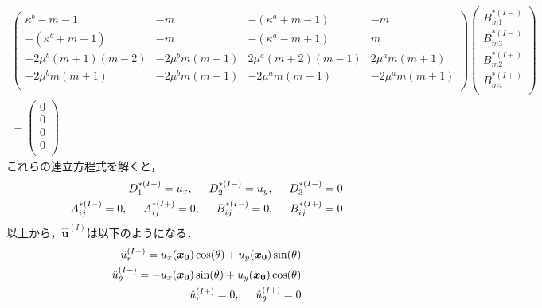 \begin{align}
	\left(
	\begin{array}{cccc}
		\kappa^b-m-1& -m & -(\kappa^a+m-1) & -m \\
		-(\kappa^b+m+1) & -m & -(\kappa^a-m+1) & m \\
		-2\mu^{b}(m+1)(m-2) & -2\mu^{b}m(m-1) &
		2\mu^{a}(m+2)(m-1) & 2\mu^{a}m(m+1) \\
		-2\mu^{b}m(m+1) & -2\mu^{b}m(m-1) &
		-2\mu^{a}m(m-1) & -2\mu^{a}m(m+1) \\
	\end{array}
	\right)
	\left(
	\begin{array}{c}
		B_{m1}^{*(I-)} \\
	 	B_{m3}^{*(I-)} \\
		B_{m2}^{*(I+)}\\
	 	B_{m4}^{*(I+)} \\
	\end{array}
	\right)
	\nonumber
	\\
	=
	\left(
	\begin{array}{c}
		0 \\
	 	0 \\
		0 \\
	 	0 \\
	\end{array}
	\right)
\end{align}
これらの連立方程式を解くと，
\begin{align}
	D_{1}^{*(I-)}=u_{x},\hspace{0.5cm}D_{2}^{*(I-)}=u_{y},\hspace{0.5cm}D_{3}^{*(I-)}=0
	\nonumber
	\\
	A_{ij}^{*(I-)}=0,\hspace{0.5cm}A_{ij}^{*(I+)}=0,\hspace{0.5cm}
	B_{ij}^{*(I-)}=0,\hspace{0.5cm}B_{ij}^{*(I+)}=0
\end{align}
以上から，$\hat{\bm{u}}^{(I)}$は以下のようになる．
\begin{align}
	\hat{u}_{r}^{(I-)}=u_{x}(\bm{x_{0}})\cos(\theta)+u_{y}(\bm{x_{0}})\sin(\theta)
	\nonumber
	\\
	\hat{u}_{\theta}^{(I-)}=-u_{x}(\bm{x_{0}})\sin(\theta)+u_{y}(\bm{x_{0}})\cos(\theta)
	\nonumber
	\\
	\hat{u}_{r}^{(I+)}=0,\hspace{0.5cm}\hat{u}_{\theta}^{(I+)}=0
\end{align}

\newpage

